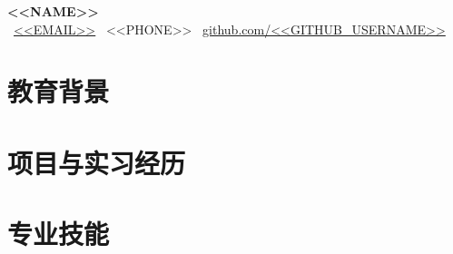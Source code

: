 \documentclass[a4paper,10pt]{article}
\begin{document}
\begin{center}
  {\LARGE \bfseries <<NAME>>} \\[6pt]
  \small \faEnvelope\ \href{mailto:<<EMAIL>>}{<<EMAIL>>} \quad
  \faPhone\ <<PHONE>> \quad
  \faGithub\ \href{https://github.com/<<GITHUB_USERNAME>>}{github.com/<<GITHUB_USERNAME>>}
\end{center}

\section{教育背景}
\begin{itemize}[label={},leftmargin=0pt]
\end{itemize}

\section{项目与实习经历}
\begin{itemize}[label={},leftmargin=0pt]
\end{itemize}

\section{专业技能}
\begin{itemize}[label={\(\bullet\)},leftmargin=0.15in]
\end{itemize}
\end{document}

